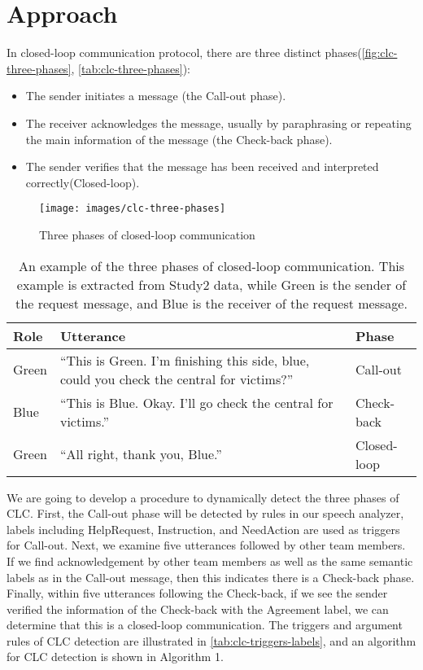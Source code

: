 \section{Approach}
In closed-loop communication protocol, there are three distinct phases\citep{Hargestam.ea:2013}(\autoref{fig:clc-three-phases}, \autoref{tab:clc-three-phases}): 
\begin{itemize}
    \item The sender initiates a message (the Call-out phase).
    \item The receiver acknowledges the message, usually by paraphrasing or repeating the main information of the message (the Check-back phase).
    \item The sender verifies that the message has been received and interpreted correctly(Closed-loop).
\end{itemize}
\begin{figure}
    \centering
    \texttt{[image: images/clc-three-phases]}
    \caption{Three phases of closed-loop communication}
    \label{fig:clc-three-phases}
\end{figure}

\begin{table*}[tb]
\centering
\begin{tabular}{lll}
    \toprule
    Role & Utterance & Phase \\\midrule
   Green & “This is Green. I’m finishing this side, blue, could you check the central for victims?” & Call-out\\
   Blue & “This is Blue. Okay. I’ll go check the central for victims.” & Check-back\\
   Green & “All right, thank you, Blue.” & Closed-loop\\
    \bottomrule
\end{tabular}
\caption{An example of the three phases of closed-loop communication. This example is extracted from Study2 data, while Green is the sender of the request message, and Blue is the receiver of the request message.}
\label{tab:clc-three-phases}
\end{table*}

We are going to develop a procedure to dynamically detect the three phases of CLC. First, the Call-out phase will be detected by rules in our speech analyzer, labels including HelpRequest, Instruction, and NeedAction are used as triggers for Call-out. Next, we examine five utterances followed by other team members. If we find acknowledgement by other team members as well as the same semantic labels as in the Call-out message, then this indicates there is a Check-back phase. Finally, within five utterances following the Check-back, if we see the sender verified the information of the Check-back with the Agreement label, we can determine that this is a closed-loop communication. The triggers and argument rules of CLC detection are illustrated in \autoref{tab:clc-triggers-labels}, and an algorithm for CLC detection is shown in Algorithm 1.

